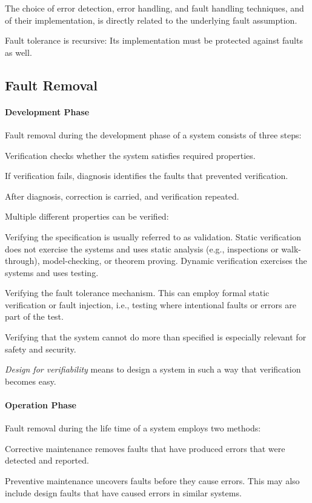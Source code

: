 The choice of error detection, error handling, and fault handling techniques, and of their implementation, is directly related to the underlying fault assumption.

Fault tolerance is recursive: Its implementation must be protected against faults as well.


\subsection{Fault Removal}

\paragraph{Development Phase}
Fault removal during the development phase of a system consists of three steps:
\begin{compactitem}
 \item Verification checks whether the system satisfies required properties.
 \item If verification fails, diagnosis identifies the faults that prevented verification.
 \item After diagnosis, correction is carried, and verification repeated.
\end{compactitem}

Multiple different properties can be verified:
\begin{compactitem}
 \item Verifying the specification is usually referred to as validation.
Static verification does not exercise the systems and uses static analysis (e.g., inspections or walk-through), model-checking, or theorem proving.
Dynamic verification exercises the systems and uses testing.
\item Verifying the fault tolerance mechanism.
This can employ formal static verification or fault injection, i.e., testing where intentional faults or errors are part of the test.
\item Verifying that the system cannot do more than specified is especially relevant for safety and security.
\end{compactitem}

\emph{Design for verifiability} means to design a system in such a way that verification becomes easy.

\paragraph{Operation Phase}
Fault removal during the life time of a system employs two methods:
\begin{compactitem}
\item Corrective maintenance removes faults that have produced errors that were detected and reported.
\item Preventive maintenance uncovers faults before they cause errors.
This may also include design faults that have caused errors in similar systems.
\end{compactitem}

